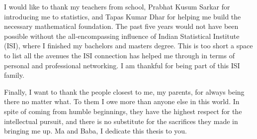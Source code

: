 I would like to thank my teachers from school, Prabhat Kusum Sarkar for introducing me to statistics, and Tapas Kumar Dhar for helping me build the necessary mathematical foundation. The past five years would not have been possible without the all-encompassing influence of Indian Statistical Institute (ISI), where I finished my bachelors and masters degree. This is too short a space to list all the avenues the ISI connection has helped me through in terms of personal and professional networking. I am thankful for being part of this ISI family.

Finally, I want to thank the people closest to me, my parents, for always being there no matter what. To them I owe more than anyone else in this world. In spite of coming from humble beginnings, they have the highest respect for the intellectual pursuit, and there is no substitute for the sacrifices they made in bringing me up. Ma and Baba, I dedicate this thesis to you.